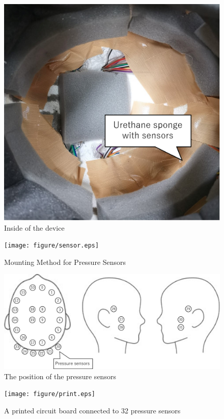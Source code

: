 \documentclass[sigchi,authordraft]{acmart}
\begin{document}
\begin{figure}[!t]
  \begin{center}
    \includegraphics[width=0.6\linewidth]{figure/met_in.eps}
  \end{center}
  \caption{Inside of the device}
  \label{fig:met_in}
\end{figure}

\begin{figure}[!t]
  \begin{center}
    \texttt{[image: figure/sensor.eps]}
  \end{center}
  \caption{Mounting Method for Pressure Sensors}
  \label{fig:sensor}
\end{figure}

\begin{figure}[!t]
  \begin{center}
    \includegraphics[width=1\linewidth]{figure/position.eps}
  \end{center}
  \caption{The position of the pressure sensors}
  \label{fig:position}
\end{figure}

\begin{figure}[!t]
  \begin{center}
    \texttt{[image: figure/print.eps]}
  \end{center}
  \caption{A printed circuit board connected to 32 pressure sensors}
  \label{fig:print}
\end{figure}
\end{document}
